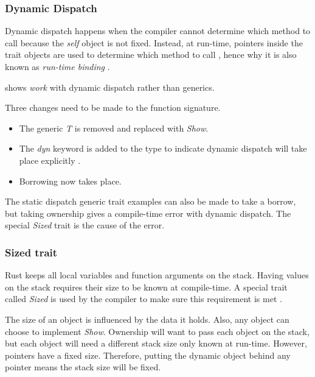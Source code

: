 \subsubsection{Dynamic Dispatch}
Dynamic dispatch \cite{alexandrescu_01_01, klabnik_2019_01} happens when the compiler cannot determine which method to call because the \textit{self} object is not fixed.
Instead, at run-time, pointers inside the trait objects are used to determine which method to call \cite{klabnik_2019_01}, hence why it is also known as \textit{run-time binding} \cite{malik_09_01}.

 shows \textit{work} with dynamic dispatch rather than generics.


Three changes need to be made to the function signature.
\begin{itemize}
	\item The generic \textit{T} is removed and replaced with \textit{Show}.
	\item The \textit{dyn} keyword is added to the type to indicate dynamic dispatch will take place explicitly \cite{klabnik_2019_01}.
	\item Borrowing now takes place.
\end{itemize}

The static dispatch generic trait examples can also be made to take a borrow, but taking ownership gives a compile-time error with dynamic dispatch.
The special \textit{Sized} trait is the cause of the error.

\subsubsection{Sized trait}
Rust keeps all local variables and function arguments on the stack.
Having values on the stack requires their size to be known at compile-time.
A special trait called \textit{Sized} is used by the compiler to make sure this requirement is met \cite{klabnik_2019_01}.

The size of an object is influenced by the data it holds.
Also, any object can choose to implement \textit{Show}.
Ownership will want to pass each object on the stack, but each object will need a different stack size only known at run-time.
However, pointers have a fixed size.
Therefore, putting the dynamic object behind any pointer means the stack size will be fixed.

